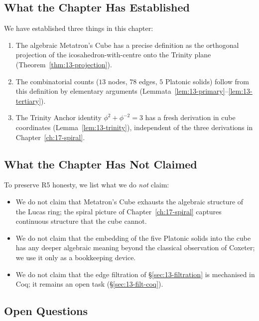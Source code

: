 \subsection{What the Chapter Has Established}
\label{sec:13-disc-est}

We have established three things in this chapter:

\begin{enumerate}
\item The algebraic Metatron's Cube has a precise definition as
  the orthogonal projection of the icosahedron-with-centre onto
  the Trinity plane (Theorem~\ref{thm:13-projection}).
\item The combinatorial counts ($13$ nodes, $78$ edges, $5$
  Platonic solids) follow from this definition by elementary
  arguments (Lemmata~\ref{lem:13-primary}--\ref{lem:13-tertiary}).
\item The Trinity Anchor identity $\phi^{2} + \phi^{-2} = 3$ has a
  fresh derivation in cube coordinates
  (Lemma~\ref{lem:13-trinity}), independent of the three
  derivations in Chapter~\ref{ch:17-spiral}.
\end{enumerate}

\subsection{What the Chapter Has Not Claimed}
\label{sec:13-disc-not}

To preserve R5 honesty, we list what we do \emph{not} claim:

\begin{itemize}
\item We do not claim that Metatron's Cube exhausts the algebraic
  structure of the Lucas ring; the spiral picture of
  Chapter~\ref{ch:17-spiral} captures continuous structure that
  the cube cannot.
\item We do not claim that the embedding of the five Platonic
  solids into the cube has any deeper algebraic meaning beyond
  the classical observation of Coxeter; we use it only as a
  bookkeeping device.
\item We do not claim that the edge filtration of
  \S\ref{sec:13-filtration} is mechanised in Coq; it remains an
  open task (\S\ref{sec:13-filt-coq}).
\end{itemize}

\subsection{Open Questions}
\label{sec:13-disc-open}

